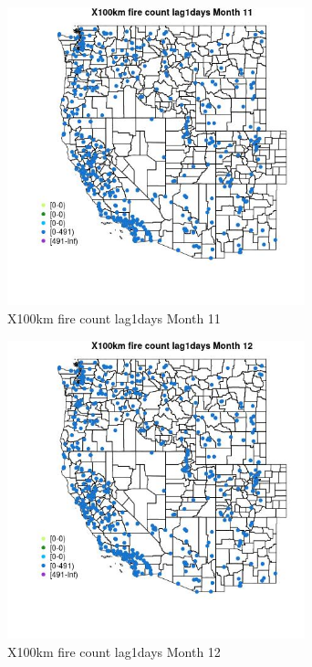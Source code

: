 \begin{figure} 
\centering  
\includegraphics[width=0.77\textwidth]{Code_Outputs/Report_ML_input_PM25_Step4_part_e_de_duplicated_aves_compiled_2019-05-14wNAs_MapObsMo11X100km_fire_count_lag1days.jpg} 
\caption{\label{fig:Report_ML_input_PM25_Step4_part_e_de_duplicated_aves_compiled_2019-05-14wNAsMapObsMo11X100km_fire_count_lag1days}X100km fire count lag1days Month 11} 
\end{figure} 
 

\begin{figure} 
\centering  
\includegraphics[width=0.77\textwidth]{Code_Outputs/Report_ML_input_PM25_Step4_part_e_de_duplicated_aves_compiled_2019-05-14wNAs_MapObsMo12X100km_fire_count_lag1days.jpg} 
\caption{\label{fig:Report_ML_input_PM25_Step4_part_e_de_duplicated_aves_compiled_2019-05-14wNAsMapObsMo12X100km_fire_count_lag1days}X100km fire count lag1days Month 12} 
\end{figure} 
 

